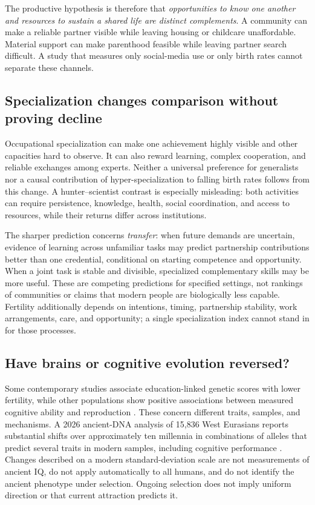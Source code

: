 \documentclass[10pt,twocolumn,letterpaper]{article}
\begin{document}
The productive hypothesis is therefore that \emph{opportunities to know one another and resources to sustain a shared life are distinct complements}. A community can make a reliable partner visible while leaving housing or childcare unaffordable. Material support can make parenthood feasible while leaving partner search difficult. A study that measures only social-media use or only birth rates cannot separate these channels.

\subsection{Specialization changes comparison without proving decline}
Occupational specialization can make one achievement highly visible and other capacities hard to observe. It can also reward learning, complex cooperation, and reliable exchanges among experts. Neither a universal preference for generalists nor a causal contribution of hyper-specialization to falling birth rates follows from this change. A hunter--scientist contrast is especially misleading: both activities can require persistence, knowledge, health, social coordination, and access to resources, while their returns differ across institutions.

The sharper prediction concerns \emph{transfer}: when future demands are uncertain, evidence of learning across unfamiliar tasks may predict partnership contributions better than one credential, conditional on starting competence and opportunity. When a joint task is stable and divisible, specialized complementary skills may be more useful. These are competing predictions for specified settings, not rankings of communities or claims that modern people are biologically less capable. Fertility additionally depends on intentions, timing, partnership stability, work arrangements, care, and opportunity; a single specialization index cannot stand in for those processes.

\subsection{Have brains or cognitive evolution reversed?}
Some contemporary studies associate education-linked genetic scores with lower fertility, while other populations show positive associations between measured cognitive ability and reproduction \citep{kong,kolk}. These concern different traits, samples, and mechanisms. A 2026 ancient-DNA analysis of 15,836 West Eurasians reports substantial shifts over approximately ten millennia in combinations of alleles that predict several traits in modern samples, including cognitive performance \citep{akbari}. Changes described on a modern standard-deviation scale are not measurements of ancient IQ, do not apply automatically to all humans, and do not identify the ancient phenotype under selection. Ongoing selection does not imply uniform direction or that current attraction predicts it.
\end{document}
